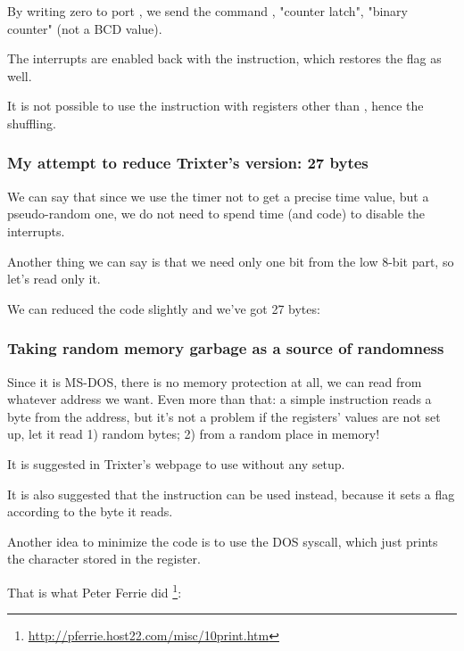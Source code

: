 By writing zero to port , 
we send the command , 
"counter latch", 
"binary counter" (not a \ac{BCD} value).

The interrupts are enabled back with the  instruction, which restores the  flag as well.

It is not possible to 
use the  instruction with registers other than , 
hence the shuffling.

\subsubsection{
My attempt to reduce Trixter's version: 27 bytes}

We can say that since we use the timer not 
to get a precise time value, but a pseudo-random one, we do not need
to spend time (and code) to disable the interrupts.

Another thing we can say is that we need only one bit from the low 8-bit part, so let's read only it.

We can reduced the code slightly and we've got 27 bytes:



\subsubsection{
Taking random memory garbage as a source of randomness}

Since it is MS-DOS, there is no memory protection at all, we can read from whatever address we want.
Even more than that: a simple  
instruction reads a byte from the  address, but it's not a problem
if the registers' values are not set up, let it read 1) random bytes; 2) from a random place in memory!

It is suggested in Trixter's webpage\FNURLTRIXTER 
to use  without any setup.

It is also suggested that the  
instruction can be used instead, because it sets a flag according to the byte it reads.

Another idea to minimize the code is to use the  DOS syscall, which just prints the character stored in the  register.

That is what Peter Ferrie did
\footnote{\url{http://pferrie.host22.com/misc/10print.htm}}:

